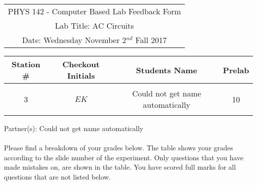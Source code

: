 \documentclass{article}
\begin{document}

\clearpage\begin{table}[h]
	\centering
	\begin{tabular}{c}
	PHYS 142 - Computer Based Lab Feedback Form\\
	Lab Title: AC Circuits\\Date: Wednesday November 2$^{nd}$ Fall 2017 \\\hline
\end{tabular}
\end{table}
\begin{table}[h]\centering \begin{tabular}{|c|c|p{9.9 cm}|c|}\hline Station \#  & Checkout Initials & \multicolumn{1}{|c|}{Students Name} & Prelab \\\hline\multirow{3}{*}{3}& \multirow{3}{*}{$EK$} & &\\& &\multicolumn{1}{|c|}{Could not get name automatically}&10\\&   &  &\\\hline
\end{tabular}
\end{table}
Partner(s): Could not get name automatically\\
\\Please find a breakdown of your grades below. The table shows your grades according to the slide number of the experiment. Only questions that you have made mistakes on, are shown in the table. You have scored full marks for all questions that are not listed below.
\end{document}
